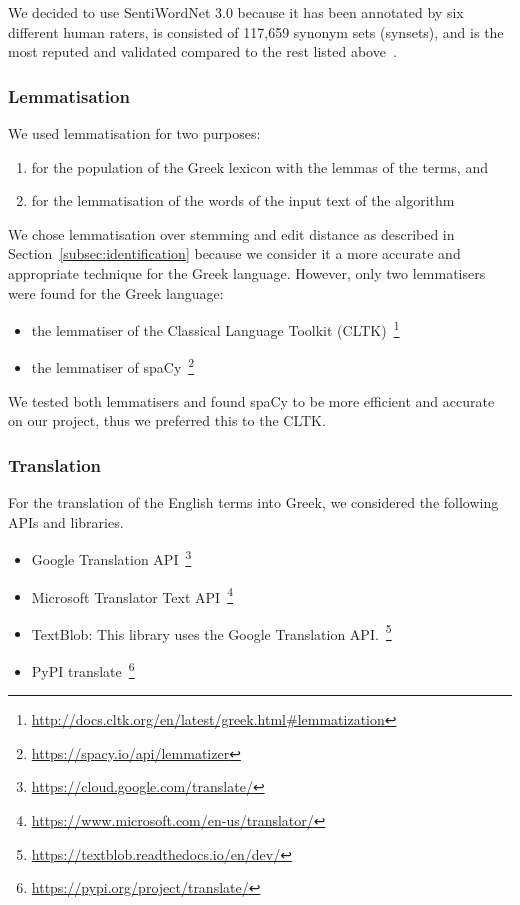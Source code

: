 We decided to use SentiWordNet 3.0 because it has been annotated
by six different human raters,
is consisted of 117,659 synonym sets (synsets),
and is the most reputed and validated compared to the rest listed above~\cite{BES10}.

\subsubsection{Lemmatisation}
\label{subsubsec:lemmatisation}

We used lemmatisation for two purposes:

\begin{enumerate}
 \item for the population of the Greek lexicon with the lemmas of the terms, and
 \item for the lemmatisation of the words of the input text of the algorithm
\end{enumerate}

We chose lemmatisation over stemming and edit distance as described in Section~\ref{subsec:identification} because we consider it a more accurate
and appropriate technique for the Greek language.
However, only two lemmatisers were found for the Greek language:

\begin{itemize}
 \item the lemmatiser of the Classical Language Toolkit (CLTK)~\footnote{\url{http://docs.cltk.org/en/latest/greek.html#lemmatization}}
 \item the lemmatiser of spaCy~\footnote{\url{https://spacy.io/api/lemmatizer}}
\end{itemize}

We tested both lemmatisers and found spaCy to be more efficient and accurate
on our project, thus we preferred this to the CLTK.

\subsubsection{Translation}
\label{subsubsec:translation}

For the translation of the English terms into Greek,
we considered the following APIs and libraries.

\begin{itemize}
 \item Google Translation API~\footnote{\url{https://cloud.google.com/translate/}}
 \item Microsoft Translator Text API~\footnote{\url{https://www.microsoft.com/en-us/translator/}}
 \item TextBlob: This library uses the Google Translation API.~\footnote{\url{https://textblob.readthedocs.io/en/dev/}}
 \item PyPI translate~\footnote{\url{https://pypi.org/project/translate/}}
\end{itemize}


